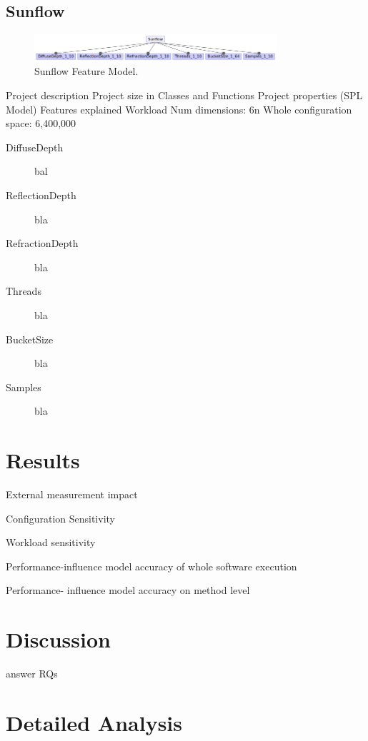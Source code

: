 \subsection{Sunflow}

\begin{figure}
  \centering
  \includegraphics[width=0.8\textwidth]{images/Sunflow_Feature_model}
  \caption{Sunflow Feature Model.}
  \label{fm_sunflow}
\end{figure}

Project description
Project size in Classes and Functions
Project properties (SPL Model)
Features explained
Workload
Num dimensions: 6n
Whole configuration space: 6,400,000

\begin{description}
	\item [DiffuseDepth] bal
	\item [ReflectionDepth] bla
	\item [RefractionDepth] bla
	\item [Threads] bla
	\item [BucketSize] bla
	\item [Samples] bla
\end{description}


\section{Results}
\label{results}
External measurement impact

Configuration Sensitivity

Workload sensitivity

Performance-influence model accuracy of whole software execution

Performance- influence model accuracy on method level


\section{Discussion}
\label{discussion}

answer RQs

\section{Detailed Analysis}
\label{delailed_analysis}

